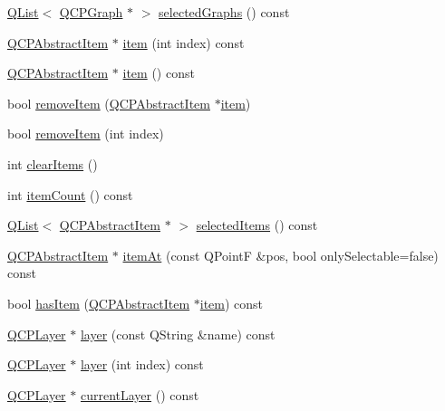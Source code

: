 \begin{DoxyCompactItemize}
\item 
\hyperlink{class_q_list}{Q\+List}$<$ \hyperlink{class_q_c_p_graph}{Q\+C\+P\+Graph} $\ast$ $>$ \hyperlink{class_q_custom_plot_ad2a0493bdd01e7aa99a4209ae3a5b67b}{selected\+Graphs} () const 
\item 
\hyperlink{class_q_c_p_abstract_item}{Q\+C\+P\+Abstract\+Item} $\ast$ \hyperlink{class_q_custom_plot_a3e842b5a65b1d17fbb96cfb1fa1314d1}{item} (int index) const 
\item 
\hyperlink{class_q_c_p_abstract_item}{Q\+C\+P\+Abstract\+Item} $\ast$ \hyperlink{class_q_custom_plot_a700399eae539798c5baf64a37c7f2135}{item} () const 
\item 
bool \hyperlink{class_q_custom_plot_ae04446557292551e8fb6e2c106e1848d}{remove\+Item} (\hyperlink{class_q_c_p_abstract_item}{Q\+C\+P\+Abstract\+Item} $\ast$\hyperlink{class_q_custom_plot_a3e842b5a65b1d17fbb96cfb1fa1314d1}{item})
\item 
bool \hyperlink{class_q_custom_plot_abcfdda3d601c0441cab136137d715dea}{remove\+Item} (int index)
\item 
int \hyperlink{class_q_custom_plot_abdfd07d4f0591d0cf967f85013fd3645}{clear\+Items} ()
\item 
int \hyperlink{class_q_custom_plot_a6fc860e30df17fd5c46056bf6fe29390}{item\+Count} () const 
\item 
\hyperlink{class_q_list}{Q\+List}$<$ \hyperlink{class_q_c_p_abstract_item}{Q\+C\+P\+Abstract\+Item} $\ast$ $>$ \hyperlink{class_q_custom_plot_a1a48b13547e2d9ac5cd6927516f47a2e}{selected\+Items} () const 
\item 
\hyperlink{class_q_c_p_abstract_item}{Q\+C\+P\+Abstract\+Item} $\ast$ \hyperlink{class_q_custom_plot_a793e4b04e0ede11a733021907368fa83}{item\+At} (const Q\+PointF \&pos, bool only\+Selectable=false) const 
\item 
bool \hyperlink{class_q_custom_plot_ab4199c38b03e63a2623c82453fe8add5}{has\+Item} (\hyperlink{class_q_c_p_abstract_item}{Q\+C\+P\+Abstract\+Item} $\ast$\hyperlink{class_q_custom_plot_a3e842b5a65b1d17fbb96cfb1fa1314d1}{item}) const 
\item 
\hyperlink{class_q_c_p_layer}{Q\+C\+P\+Layer} $\ast$ \hyperlink{class_q_custom_plot_aac492da01782820454e9136a8db28182}{layer} (const Q\+String \&name) const 
\item 
\hyperlink{class_q_c_p_layer}{Q\+C\+P\+Layer} $\ast$ \hyperlink{class_q_custom_plot_a1e73051e371f1815b48d8b355be0d2ab}{layer} (int index) const 
\item 
\hyperlink{class_q_c_p_layer}{Q\+C\+P\+Layer} $\ast$ \hyperlink{class_q_custom_plot_af73057345656cbd1463454982d808b00}{current\+Layer} () const 

\end{DoxyCompactItemize}
